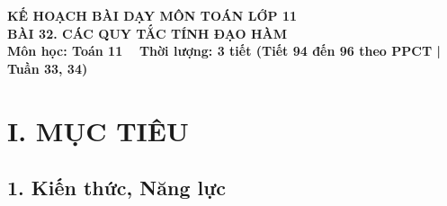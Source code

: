 \documentclass[12pt, a4paper]{article}
\begin{document}
\begin{center}
    {\fontsize{14pt}{17pt}\selectfont \textbf{KẾ HOẠCH BÀI DẠY MÔN TOÁN LỚP 11}}\\[6pt]
    {\fontsize{16pt}{19pt}\selectfont \textbf{BÀI 32. CÁC QUY TẮC TÍNH ĐẠO HÀM}}\\[4pt]
    {\fontsize{12pt}{15pt}\selectfont \textbf{Môn học: Toán 11} \ \textbar \ \textbf{Thời lượng: 3 tiết (Tiết 94 đến 96 theo PPCT | Tuần 33, 34)}}
\end{center}

\vspace{5pt}

\section*{I. MỤC TIÊU}

\subsection*{1. Kiến thức, Năng lực}
\end{document}
